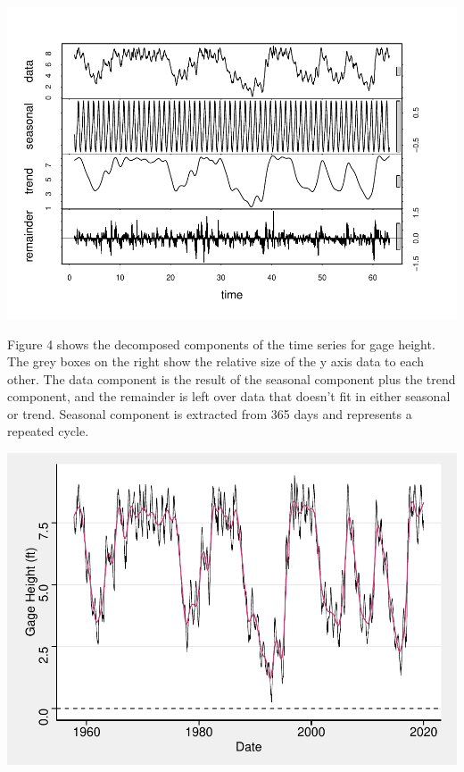 \documentclass[12pt,]{article}
\let\origfigure\figure
\let\endorigfigure\endfigure
\renewenvironment{figure}[1][2] {
    \expandafter\origfigure\expandafter[H]
} {
    \endorigfigure
}
\begin{document}
\begin{figure}
\centering
\includegraphics{Shintaku_ENV872_Project_files/figure-latex/unnamed-chunk-7-1.pdf}
\caption{Lake Tahoe Gage Height Time Series Decomposed}
\end{figure}

Figure 4 shows the decomposed components of the time series for gage
height. The grey boxes on the right show the relative size of the y axis
data to each other. The data component is the result of the seasonal
component plus the trend component, and the remainder is left over data
that doesn't fit in either seasonal or trend. Seasonal component is
extracted from 365 days and represents a repeated cycle.

\begin{figure}
\centering
\includegraphics{Shintaku_ENV872_Project_files/figure-latex/unnamed-chunk-8-1.pdf}
\caption{Trend Component Against Actual Data}
\end{figure}
\end{document}
